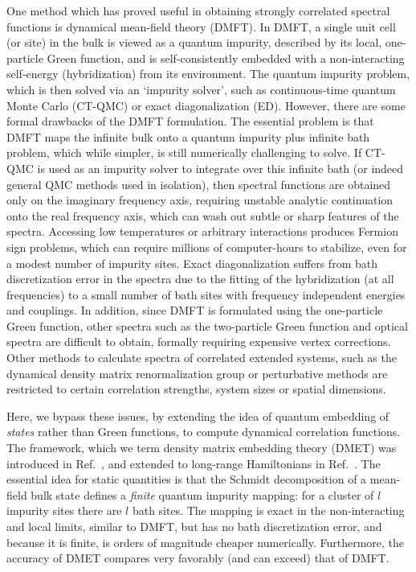\documentclass[aps,twocolumn,nobibnotes]{revtex4}
\begin{document}
One method which has proved useful in obtaining strongly correlated spectral functions is dynamical mean-field 
theory (DMFT)\cite{Georges1992,Georges1996,Kotliar2006}. In 
DMFT, a single unit cell (or site) in the bulk is viewed as a quantum impurity, described by its local, one-particle Green function,
and is self-consistently embedded with a non-interacting self-energy (hybridization) from its environment.
The quantum impurity problem, which is then solved via an `impurity solver', such as
continuous-time quantum Monte Carlo (CT-QMC)\cite{Millis2006} or exact diagonalization (ED)\cite{Zgid2012}. 
However, there are some formal drawbacks of the DMFT formulation. 
The essential problem is that DMFT maps the infinite bulk onto a quantum impurity plus infinite bath problem, which while 
simpler, is still numerically challenging to solve.
If CT-QMC is used as an 
impurity solver to integrate over this infinite bath (or indeed general QMC methods used in isolation), then spectral 
functions are obtained only on the imaginary frequency 
axis, requiring unstable analytic continuation onto the real frequency axis, which can wash out subtle or sharp features of the 
spectra\cite{Millis2009}. Accessing low temperatures or arbitrary interactions produces Fermion sign problems, which can require millions
of computer-hours to stabilize, even for a modest number of impurity sites.
Exact diagonalization suffers from bath discretization error in the spectra due to the 
fitting of the hybridization (at all frequencies) to a small number of bath sites with 
frequency independent energies and couplings\cite{Liebsch2012}. In addition, since DMFT
is formulated using the one-particle Green function, other spectra such as the two-particle Green function and optical spectra are 
difficult to obtain, formally requiring expensive vertex corrections\cite{Millis2012}. Other methods to calculate 
spectra of correlated extended systems, such as the dynamical density matrix renormalization group\cite{Jeckelmann2004} or perturbative
methods\cite{Senechal2000} are restricted to certain correlation strengths, system sizes or spatial dimensions.

Here, we bypass these issues, by extending the idea of quantum embedding of {\em states} rather than Green functions, to compute dynamical
correlation functions. The framework, which we term density matrix embedding theory (DMET) was introduced in 
Ref.~, and extended to long-range Hamiltonians in Ref.~. 
The essential idea for static quantities is that the Schmidt decomposition of a mean-field bulk state defines a {\em finite} quantum impurity mapping:
for a cluster of $l$ impurity sites there are $l$ bath sites. The mapping is exact in the non-interacting and local limits, similar to DMFT, but
has no bath discretization error, and because it is finite, is orders of magnitude cheaper numerically. Furthermore, the accuracy of DMET compares
very favorably (and can exceed) that of DMFT.
\end{document}
